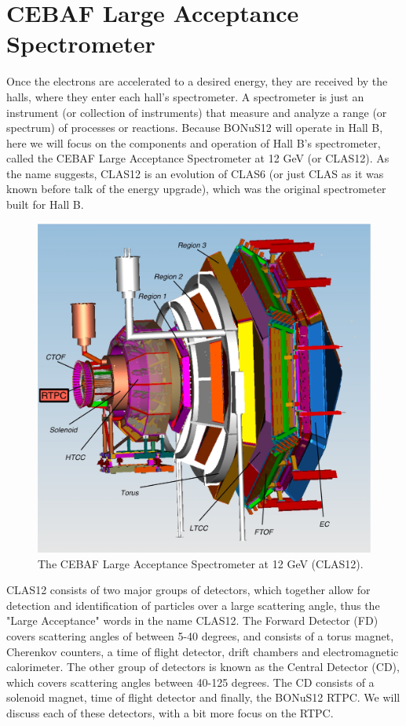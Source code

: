 \section{CEBAF Large Acceptance Spectrometer}
Once the electrons are accelerated to a desired energy, they are received by the halls, where they enter each hall's spectrometer. A spectrometer is just an instrument (or collection of instruments) that measure and analyze a range (or spectrum) of processes or reactions. Because BONuS12 will operate in Hall B, here we will focus on the components and operation of Hall B's spectrometer, called the CEBAF Large Acceptance Spectrometer at 12 GeV (or CLAS12). As the name suggests, CLAS12 is an evolution of CLAS6 (or just CLAS as it was known before talk of the energy upgrade), which was the original spectrometer built for Hall B. 

\begin{figure}[h!]
	\centering
	\includegraphics[width=0.8\linewidth]{figures/clas12.png}
	\caption{The CEBAF Large Acceptance Spectrometer at 12 GeV (CLAS12).}
	\label{fig:cals12}
\end{figure}

CLAS12 consists of two major groups of detectors, which together allow for detection and identification of particles over a large scattering angle, thus the "Large Acceptance" words in the name CLAS12. The Forward Detector (FD) covers scattering angles of between 5-40 degrees, and consists of a torus magnet, Cherenkov counters, a time of flight detector, drift chambers and electromagnetic calorimeter. The other group of detectors is known as the Central Detector (CD), which covers scattering angles between 40-125 degrees. The CD consists of a solenoid magnet, time of flight detector and finally, the BONuS12 RTPC. We will discuss each of these detectors, with a bit more focus on the RTPC.

